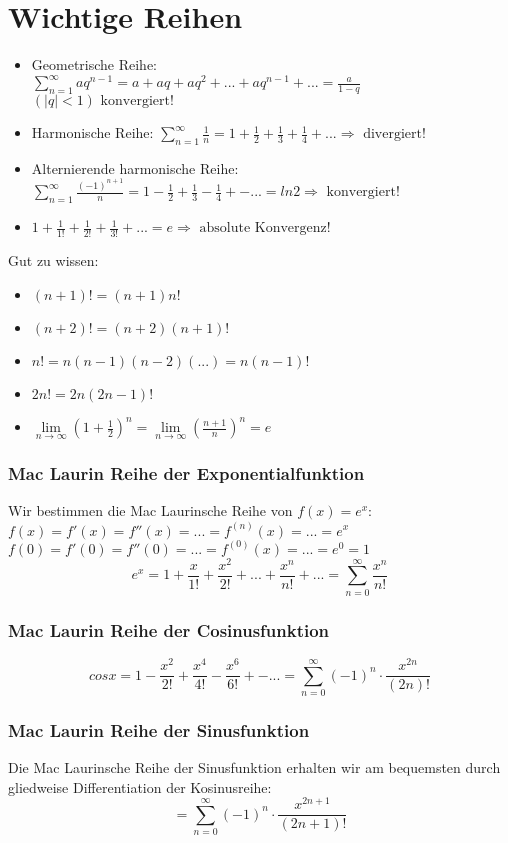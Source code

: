 \section{Wichtige Reihen}
\begin{itemize}
	\item Geometrische Reihe: \\$\sum\limits_{n=1}^{\infty} aq^{n-1} = a + aq + aq^2 + ... + aq^{n-1} + ... = \frac{a}{1-q}$  $(|q| <1) \text{ konvergiert! }$
	\item Harmonische Reihe: $\sum\limits_{n=1}^{\infty} \frac{1}{n} = 1 + \frac{1}{2} + \frac{1}{3} + \frac{1}{4} + ... \Rightarrow \text{ divergiert! }$
	\item Alternierende harmonische Reihe: $\sum\limits_{n=1}^{\infty} \frac{(-1)^{n+1}}{n} = 1 - \frac{1}{2} + \frac{1}{3} - \frac{1}{4} + - ... = ln{2} \Rightarrow \text{ konvergiert! } $
	\item $1 + \frac{1}{1!} + \frac{1}{2!}+\frac{1}{3!} + ... = e \Rightarrow \text{ absolute Konvergenz! }$
\end{itemize}
Gut zu wissen:
\begin{itemize}
	\item $(n+1)! = (n+1)n!$
	\item $(n+2)! = (n+2)(n+1)!$
	\item $n! = n(n-1)(n-2)(...) = n(n-1)!$
	\item $2n! = 2n(2n-1)!$
	\item $\lim\limits_{n \rightarrow \infty}(1+\frac{1}{2})^n = \lim\limits_{n \rightarrow \infty}\left(\frac{n+1}{n}\right)^n = e $
\end{itemize}

\subsubsection*{Mac Laurin Reihe der Exponentialfunktion}
Wir bestimmen die Mac Laurinsche Reihe von $f(x) = e^x$:\\
$f(x) = f'(x) = f''(x) = ... = f^{(n)}(x) = ... = e^x$\\
$f(0) = f'(0) = f''(0) = ... = f^{(0)}(x) = ... = e^0 = 1$
$$e^x = 1 + \frac{x}{1!} + \frac{x^2}{2!} + ... + \frac{x^n}{n!} + ... = \sum\limits_{n=0}^{\infty} \frac{x^n}{n!}$$

\subsubsection*{Mac Laurin Reihe der Cosinusfunktion}
$$cos x = 1 - \frac{x^2}{2!} + \frac{x^4}{4!} - \frac{x^6}{6!} +- ... =  \sum\limits_{n=0}^{\infty}(-1)^n \cdot \frac{x^{2n}}{(2n)!}$$

\subsubsection*{Mac Laurin Reihe der Sinusfunktion}
Die Mac Laurinsche Reihe der Sinusfunktion erhalten wir am bequemsten durch gliedweise Differentiation der Kosinusreihe:
$$ = \sum\limits_{n=0}^{\infty} (-1)^n \cdot \frac{x^{2n+1}}{(2n+1)!}$$

